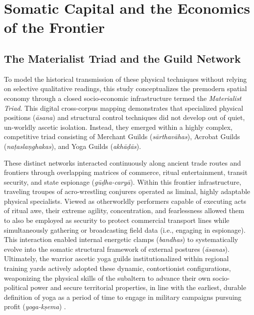 \documentclass[11pt,twoside,letterpaper]{article}
\begin{document}

\section{Somatic Capital and the Economics of the Frontier}
\label{sec:somatic_capital_frontier_economics}

\subsection{The Materialist Triad and the Guild Network}

To model the historical transmission of these physical techniques without relying on selective qualitative readings, this study conceptualizes the premodern spatial economy through a closed socio-economic infrastructure termed the \textit{Materialist Triad}. This digital cross-corpus mapping demonstrates that specialized physical positions (\textit{āsana}) and structural control techniques did not develop out of quiet, un-worldly ascetic isolation. Instead, they emerged within a highly complex, competitive triad consisting of Merchant Guilds (\textit{sārthavāhas}), Acrobat Guilds (\textit{naṭas}\text{/}\textit{laṇghakas}), and Yoga Guilds (\textit{akhāḍās}).

These distinct networks interacted continuously along ancient trade routes and frontiers through overlapping matrices of commerce, ritual entertainment, transit security, and state espionage (\textit{gūḍha-caryā}). Within this frontier infrastructure, traveling troupes of acro-wrestling conjurers operated as liminal, highly adaptable physical specialists. Viewed as otherworldly performers capable of executing acts of ritual awe, their extreme agility, concentration, and fearlessness allowed them to also be employed as security to protect commercial transport lines while simultaneously gathering or broadcasting field data (i.e., engaging in espionage). This interaction enabled internal energetic clamps (\textit{bandhas}) to systematically evolve into the somatic structural framework of external postures (\textit{āsanas}). Ultimately, the warrior ascetic yoga guilds institutionalized within regional training yards actively adopted these dynamic, contortionist configurations, weaponizing the physical skills of the subaltern to advance their own socio-political power and secure territorial properties, in line with the earliest, durable definition of yoga as a period of time to engage in military campaigns pursuing profit (\textit{yoga-kṣema}) \citep{oberlies2024,gwilt2024}.
\end{document}
